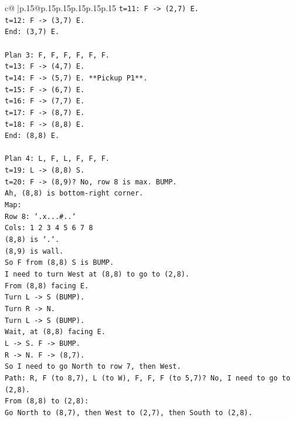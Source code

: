 \documentclass{article}
\begin{document}
{\begin{supertabular}{c@{$\;$}|p{.15\linewidth}@{}p{.15\linewidth}p{.15\linewidth}p{.15\linewidth}p{.15\linewidth}p{.15\linewidth}}
{{{\texttt{t=11: F {-}> (2,7) E.} \\
\texttt{t=12: F {-}> (3,7) E.} \\
\texttt{End: (3,7) E.} \\
\\ 
\texttt{Plan 3: F, F, F, F, F, F.} \\
\texttt{t=13: F {-}> (4,7) E.} \\
\texttt{t=14: F {-}> (5,7) E. **Pickup P1**.} \\
\texttt{t=15: F {-}> (6,7) E.} \\
\texttt{t=16: F {-}> (7,7) E.} \\
\texttt{t=17: F {-}> (8,7) E.} \\
\texttt{t=18: F {-}> (8,8) E.} \\
\texttt{End: (8,8) E.} \\
\\ 
\texttt{Plan 4: L, F, L, F, F, F.} \\
\texttt{t=19: L {-}> (8,8) S.} \\
\texttt{t=20: F {-}> (8,9)? No, row 8 is max. BUMP.} \\
\texttt{Ah, (8,8) is bottom{-}right corner.} \\
\texttt{Map:} \\
\texttt{Row 8: `.x...\#..`} \\
\texttt{Cols: 1 2 3 4 5 6 7 8} \\
\texttt{(8,8) is `.`.} \\
\texttt{(8,9) is wall.} \\
\texttt{So F from (8,8) S is BUMP.} \\
\texttt{I need to turn West at (8,8) to go to (2,8).} \\
\texttt{From (8,8) facing E.} \\
\texttt{Turn L {-}> S (BUMP).} \\
\texttt{Turn R {-}> N.} \\
\texttt{Turn L {-}> S (BUMP).} \\
\texttt{Wait, at (8,8) facing E.} \\
\texttt{L {-}> S. F {-}> BUMP.} \\
\texttt{R {-}> N. F {-}> (8,7).} \\
\texttt{So I need to go North to row 7, then West.} \\
\texttt{Path: R, F (to 8,7), L (to W), F, F, F (to 5,7)? No, I need to go to (2,8).} \\
\texttt{From (8,8) to (2,8):} \\
\texttt{Go North to (8,7), then West to (2,7), then South to (2,8).} \\
}}}
\end{supertabular}}
\end{document}
